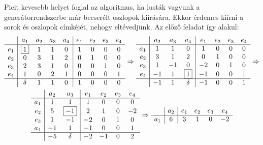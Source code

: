 \documentclass[9pt, a4paper, showtrims]{memoir}
\theoremstyle{plain}
\theoremstyle{remark}
\theoremstyle{definition}
\begin{document}
Picit kevesebb helyet foglal az algoritmus, ha lusták vagyunk a generátorrendszerbe már becserélt
oszlopok kiírására.
Ekkor érdemes kiírni a sorok és oszlopok címkéjét, nehogy eltévedjünk.
Az előző feladat így alakul:
\begin{multline*}
	\begin{array}{r|cccc|cccc}
		    & a_1       & a_2 & a_3 & a_4 & e_1 & e_2 & e_3 & e_4 \\
		\hline
		e_1 & \boxed{1} & 1   & 1   & 0   & 1   & 0   & 0   & 0   \\
		e_2 & 0         & 3   & 1   & 2   & 0   & 1   & 0   & 0   \\
		e_3 & 2         & 3   & 1   & 0   & 0   & 0   & 1   & 0   \\
		e_4 & 1         & 0   & 2   & 1   & 0   & 0   & 0   & 1   \\
		\hline
		    & \delta    & 1   & 1   & 0   & 1   & 0   & 0   & 0
	\end{array}\Rightarrow
	\begin{array}{r|ccc|cccc}
		    & a_2 & a_3 & a_4       & e_1 & e_2 & e_3 & e_4 \\
		\hline
		a_1 & 1   & 1   & 0         & 1   & 0   & 0   & 0   \\
		e_2 & 3   & 1   & 2         & 0   & 1   & 0   & 0   \\
		e_3 & 1   & -1  & 0         & -2  & 0   & 1   & 0   \\
		e_4 & -1  & 1   & \boxed{1} & -1  & 0   & 0   & 1   \\
		\hline
		    & -1  & 1   & \delta    & -1  & 0   & 0   & 1
	\end{array}\Rightarrow
	\\
	\begin{array}{r|cc|cccc}
		    & a_2 & a_3        & e_1 & e_2 & e_3 & e_4 \\
		\hline
		a_1 & 1   & 1          & 1   & 0   & 0   & 0   \\
		e_2 & 5   & \boxed{-1} & 2   & 1   & 0   & -2  \\
		e_3 & 1   & -1         & -2  & 0   & 1   & 0   \\
		a_4 & -1  & 1          & -1  & 0   & 0   & 1   \\
		\hline
		    & -5  & \delta     & -2  & -1  & 0   & 2
	\end{array}\Rightarrow
	\begin{array}{r|c|cccc}
		    & a_2        & e_1 & e_2         & e_3          & e_4          \\
		\hline
		a_1 & 6          & 3   & 1           & 0            & -2           \\

\end{array}
\end{multline*}
\end{document}

